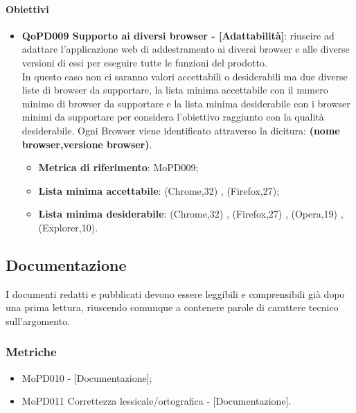 \documentclass[../piano-di-qualifica.tex]{subfiles}
\begin{document}
\paragraph{Obiettivi}
\label{sub:obiettivi}
\begin{itemize}
    \item \textbf{QoPD009 Supporto ai diversi browser - [Adattabilità]}: riuscire ad adattare l'applicazione web di addestramento ai diversi browser e alle diverse versioni di essi per eseguire tutte le funzioni del prodotto.
        \\ In questo caso non ci saranno valori accettabili o desiderabili ma due diverse liste di browser da supportare, la lista minima accettabile con il numero minimo di browser da supportare e la lista minima desiderabile con i browser minimi da supportare per considera l'obiettivo raggiunto con la qualità desiderabile.
        Ogni Browser viene identificato attraverso la dicitura: \textbf{(nome browser,versione browser)}.
        \begin{itemize}
            \item \textbf{Metrica di riferimento}: MoPD009;
            \item \textbf{Lista minima accettabile}: {(Chrome,32) , (Firefox,27)};
            \item \textbf{Lista minima desiderabile}: {(Chrome,32) , (Firefox,27) , (Opera,19) , (Explorer,10)}.
        \end{itemize}
\end{itemize}

\subsection{Documentazione}%
\label{sub:documentazione}
I documenti redatti e pubblicati devono essere leggibili e comprensibili già dopo una prima lettura, riuscendo comunque a contenere parole di carattere tecnico sull'argomento.

\subsubsection{Metriche}
\label{sub:metriche}
\begin{itemize}
    \item MoPD010  - [Documentazione];
    \item MoPD011 Correttezza lessicale/ortografica - [Documentazione].
\end{itemize}
\end{document}
